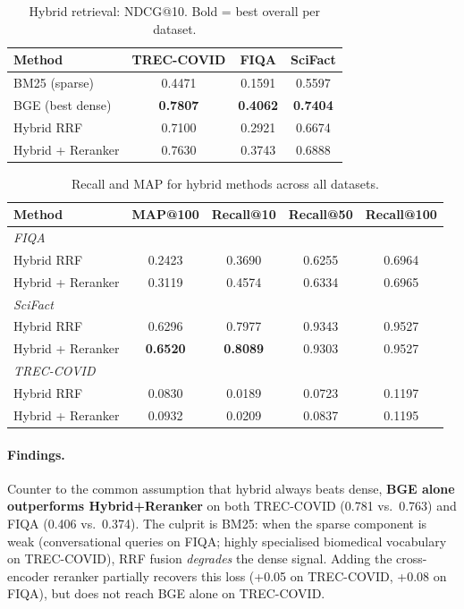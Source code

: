 \documentclass[12pt, a4paper]{article}
\makeatletter
\newcommand{\ndcg}{NDCG@10}
\newcommand{\map}{MAP@100}
\newcommand{\tc}{TREC-COVID}
\newcommand{\fiqa}{FIQA}
\newcommand{\scifact}{SciFact}
\makeatother
\begin{document}
\begin{table}[h]
\centering
\caption{Hybrid retrieval: \ndcg{}.  Bold = best overall per dataset.}
\label{tab:hybrid_ndcg}
\begin{tabular}{lccc}
\toprule
\textbf{Method} & \textbf{\tc{}} & \textbf{\fiqa{}} & \textbf{\scifact{}} \\
\midrule
BM25 (sparse)        & 0.4471 & 0.1591 & 0.5597 \\
BGE (best dense)     & \textbf{0.7807} & \textbf{0.4062} & \textbf{0.7404} \\
Hybrid RRF           & 0.7100 & 0.2921 & 0.6674 \\
Hybrid + Reranker    & 0.7630 & 0.3743 & 0.6888 \\
\bottomrule
\end{tabular}
\end{table}

\begin{table}[h]
\centering
\caption{Recall and MAP for hybrid methods across all datasets.}
\label{tab:hybrid_recall}
\begin{tabular}{lcccc}
\toprule
\textbf{Method} & \textbf{\map{}} & \textbf{Recall@10} & \textbf{Recall@50} & \textbf{Recall@100} \\
\midrule
\multicolumn{5}{l}{\textit{\fiqa{}}} \\
Hybrid RRF           & 0.2423 & 0.3690 & 0.6255 & 0.6964 \\
Hybrid + Reranker    & 0.3119 & 0.4574 & 0.6334 & 0.6965 \\
\midrule
\multicolumn{5}{l}{\textit{\scifact{}}} \\
Hybrid RRF           & 0.6296 & 0.7977 & 0.9343 & 0.9527 \\
Hybrid + Reranker    & \textbf{0.6520} & \textbf{0.8089} & 0.9303 & 0.9527 \\
\midrule
\multicolumn{5}{l}{\textit{\tc{}}} \\
Hybrid RRF           & 0.0830 & 0.0189 & 0.0723 & 0.1197 \\
Hybrid + Reranker    & 0.0932 & 0.0209 & 0.0837 & 0.1195 \\
\bottomrule
\end{tabular}
\end{table}

\paragraph{Findings.}
Counter to the common assumption that hybrid always beats dense,
\textbf{BGE alone outperforms Hybrid+Reranker} on both \tc{} (0.781
vs.\ 0.763) and \fiqa{} (0.406 vs.\ 0.374).  The culprit is BM25:
when the sparse component is weak (conversational queries on \fiqa{};
highly specialised biomedical vocabulary on \tc{}), RRF fusion
\emph{degrades} the dense signal.  Adding the cross-encoder reranker
partially recovers this loss (+0.05 on \tc{}, +0.08 on \fiqa{}), but
does not reach BGE alone on \tc{}.
\end{document}
